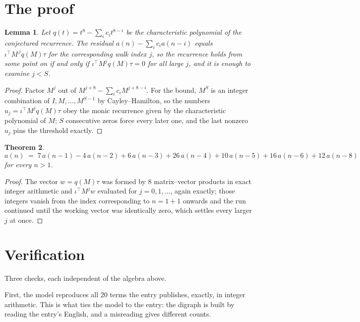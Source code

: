 \documentclass[11pt,a4paper]{article}
\theoremstyle{plain}
\newtheorem{theorem}{Theorem}
\newtheorem{lemma}[theorem]{Lemma}
\theoremstyle{definition}
\begin{document}
\section{The proof}

\begin{lemma}\label{lem:crit}
Let $q(t)=t^{8}-\sum_i c_it^{8-i}$ be the characteristic polynomial of the
conjectured recurrence. The residual $a(n)-\sum_ic_ia(n-i)$ equals
$\iota^{\!\top}M^{\,j}q(M)\tau$ for the corresponding walk index $j$, so the recurrence
holds from some point on if and only if $\iota^{\!\top}M^{j}q(M)\tau=0$ for all large $j$,
and it is enough to examine $j<S$.
\end{lemma}

\begin{proof}
Factor $M^{j}$ out of $M^{j+8}-\sum_ic_iM^{j+8-i}$. For the bound, $M^{S}$
is an integer combination of $I,M,\dots,M^{S-1}$ by Cayley--Hamilton, so the numbers
$u_j=\iota^{\!\top}M^{j}q(M)\tau$ obey the monic recurrence given by the characteristic
polynomial of $M$; $S$ consecutive zeros force every later one, and the last nonzero $u_j$
pins the threshold exactly.
\end{proof}

\begin{theorem}
\[
a(n)\;=\;7\,a(n-1) - 4\,a(n-2) + 6\,a(n-3) + 26\,a(n-4) + 10\,a(n-5) + 16\,a(n-6) + 12\,a(n-8)
\]
for every $n>1$.
\end{theorem}

\begin{proof}
The vector $w=q(M)\tau$ was formed by $8$ matrix--vector products in exact integer
arithmetic and $\iota^{\!\top}M^{j}w$ evaluated for $j=0,1,\dots$, again exactly; those
integers vanish from the index corresponding to $n=1+1$ onwards and the run continued
until the working vector was identically zero, which settles every larger $j$ at once.
\end{proof}

\section{Verification}

Three checks, each independent of the algebra above.

First, the model reproduces all $20$ terms the entry publishes, exactly, in integer
arithmetic. This is what ties the model to the entry: the digraph is built by reading the
entry's English, and a misreading gives different counts.
\end{document}
